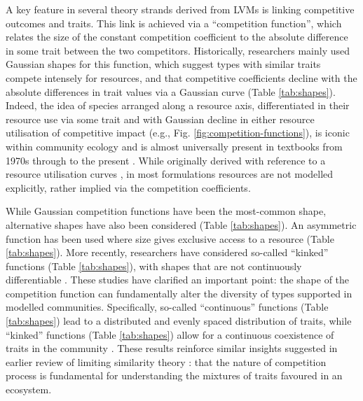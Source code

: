 \documentclass[a4paper,11pt]{article}
\begin{document}
A key feature in several theory strands derived from LVMs is linking competitive outcomes and traits. This link is achieved via a ``competition function'', which relates the size of the constant competition coefficient to the absolute difference in some trait between the two competitors. Historically, researchers mainly used Gaussian shapes for this function, which suggest types with similar traits compete intensely for resources, and that competitive coefficients decline with the absolute differences in trait values via a Gaussian curve (Table \ref{tab:shapes}). Indeed, the idea of species arranged along a resource axis, differentiated in their resource use via some trait and with Gaussian decline in either resource utilisation of competitive impact (e.g., Fig. \ref{fig:competition-functions}), is iconic within community ecology and is almost universally present in textbooks from 1970s through to the present \citep[e.g.,][]{Krebs-1972, Ricklefs-1973, Ricklefs-1999, Krebs-2013}. While originally derived with reference to a resource utilisation curves \citep{MacArthur-1967, Roughgarden-1979}, in most formulations resources are not modelled explicitly, rather implied via the competition coefficients.

While Gaussian competition functions have been the most-common shape,
alternative shapes have also been considered (Table
\ref{tab:shapes}). An asymmetric function has been used where size
gives exclusive access to a resource \citep[e.g.]{Law-1997,
  Kisdi-1999, Geritz-1999, Egas-2004, Calcagno-2006, DAndrea-2013}
(Table \ref{tab:shapes}). More recently, researchers have considered
so-called ``kinked'' functions (Table \ref{tab:shapes}), with shapes
that are not continuously differentiable \citep{Calcagno-2006,
  Scheffer-2006, Pigolotti-2007, Leimar-2013, Barabas-2013}. These
studies have clarified an important point: the shape of the
competition function can fundamentally alter the diversity of types
supported in modelled communities. Specifically, so-called
``continuous'' functions (Table \ref{tab:shapes}) lead to a
distributed and evenly spaced distribution of traits, while ``kinked''
functions (Table \ref{tab:shapes}) allow for a continuous coexistence
of traits in the community \citep{Scheffer-2006, Pigolotti-2007,
  Leimar-2013, Barabas-2013, DAndrea-2013}. These results reinforce
similar insights suggested in earlier review of limiting similarity
theory \citep{Abrams-1983}: that the nature of competition process is fundamental for understanding the mixtures of traits favoured in an ecosystem.
\end{document}
